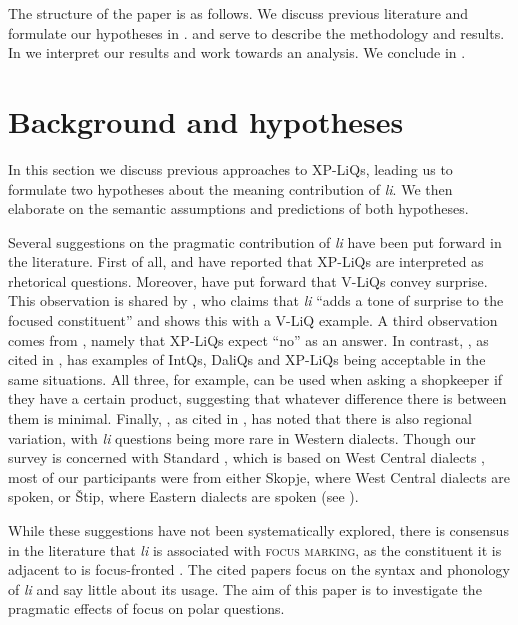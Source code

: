 \documentclass[output=paper,
colorlinks,
citecolor=brown,
newtxmath
]{langscibook}
\begin{document}
The structure of the paper is as follows. We discuss previous literature and formulate our hypotheses in .  and  serve to describe the methodology and results. In  we interpret our results and work towards an analysis. We conclude in .
\section{Background and hypotheses}\label{sec:back}

In this section we discuss previous approaches to XP-LiQs, leading us to formulate two hypotheses about the meaning contribution of \textit{li}. We then elaborate on the semantic assumptions and predictions of both hypotheses.

Several suggestions on the pragmatic contribution of \textit{li} have been put forward in the literature. First of all, \citet{minova1987} and \citet{Rudin.Kramer.Billings.Baerman1999} have reported that XP-LiQs are interpreted as rhetorical questions. Moreover, \citet{Rudin.Kramer.Billings.Baerman1999} have put forward that V-LiQs convey surprise. This observation is shared by \citet[137]{lazarova2003},  who claims that \textit{li} ``adds a tone of surprise to the focused constituent'' and shows this with a V-LiQ example. A third observation comes from \citet{englund1977}, namely that XP-LiQs expect ``no'' as an answer. In contrast, \citet{kramer1985}, as cited in \citet{Rudin.Kramer.Billings.Baerman1999}, has examples of IntQs, DaliQs and XP-LiQs being acceptable in the same situations. All three, for example, can be used when asking a shopkeeper if they have a certain product, suggesting that whatever difference there is between them is minimal. Finally, \citet{koneski1965}, as cited in \citet[128]{englund1977}, has noted that there is also regional variation, with \textit{li} questions being more rare in Western dialects. Though our survey is concerned with Standard , which is based on West Central dialects \citep{Friedman2001}, most of our participants were from either Skopje, where West Central dialects are spoken, or Štip, where Eastern dialects are spoken (see ).

While these suggestions have not been systematically explored, there is consensus in the literature that
\textit{li} is associated with \textsc{focus marking}, as the constituent it is adjacent to is focus-fronted \citep{Tomic1996a, Rudin.Kramer.Billings.Baerman1999,schwabe2004,lazarova2003}. The cited papers focus on the syntax and phonology of \textit{li} and say little about its usage. The aim of this paper is to investigate the pragmatic effects of focus on polar questions.
\end{document}
